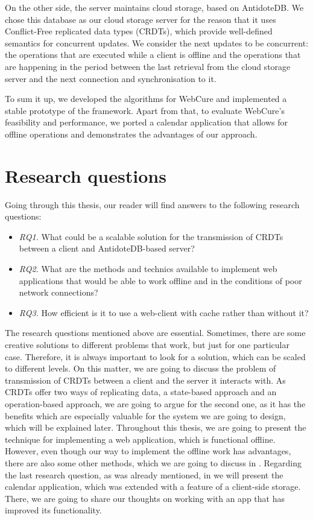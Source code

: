 On the other side, the server maintains cloud storage, based on AntidoteDB. We chose this database as our cloud storage server for the reason that it uses Conflict-Free replicated data types (CRDTs), which provide well-defined semantics for concurrent updates. We consider the next updates to be concurrent: the operations that are executed while a client is offline and the operations that are happening in the period between the last retrieval from the cloud storage server and the next connection and synchronisation to it. 

To sum it up, we developed the algorithms for WebCure and implemented a stable prototype of the framework. Apart from that, to evaluate WebCure's feasibility and performance, we ported a calendar application that allows for offline operations and demonstrates the advantages of our approach.

\section{Research questions}
\label{Introduction-Research}

Going through this thesis, our reader will find answers to the following research questions:

\begin{itemize}
    \item \textit{RQ1.} What could be a scalable solution for the transmission of CRDTs between a client and AntidoteDB-based server?
    \item \textit{RQ2.} What are the methods and technics available to implement web applications that would be able to work offline and
    in the conditions of poor network connections?
    \item \textit{RQ3.} How efficient is it to use a web-client with cache rather than without it?
  \end{itemize}

The research questions mentioned above are essential. Sometimes, there are some creative solutions to different problems that work, but just for one particular case. Therefore, it is always important to look for a solution, which can be scaled to different levels. On this matter, we are going to discuss the problem of transmission of CRDTs between a client and the server it interacts with. As CRDTs offer two ways of replicating data, a state-based approach and an operation-based approach, we are going to argue for the second one, as it has the benefits which are especially valuable for the system we are going to design, which will be explained later. Throughout this thesis, we are going to present the technique for implementing a web application, which is functional offline. However, even though our way to implement the offline work has advantages, there are also some other methods, which we are going to discuss in . Regarding the last research question, as was already mentioned, in  we will present the calendar application, which was extended with a feature of a client-side storage. There, we are going to share our thoughts on working with an app that has improved its functionality.

